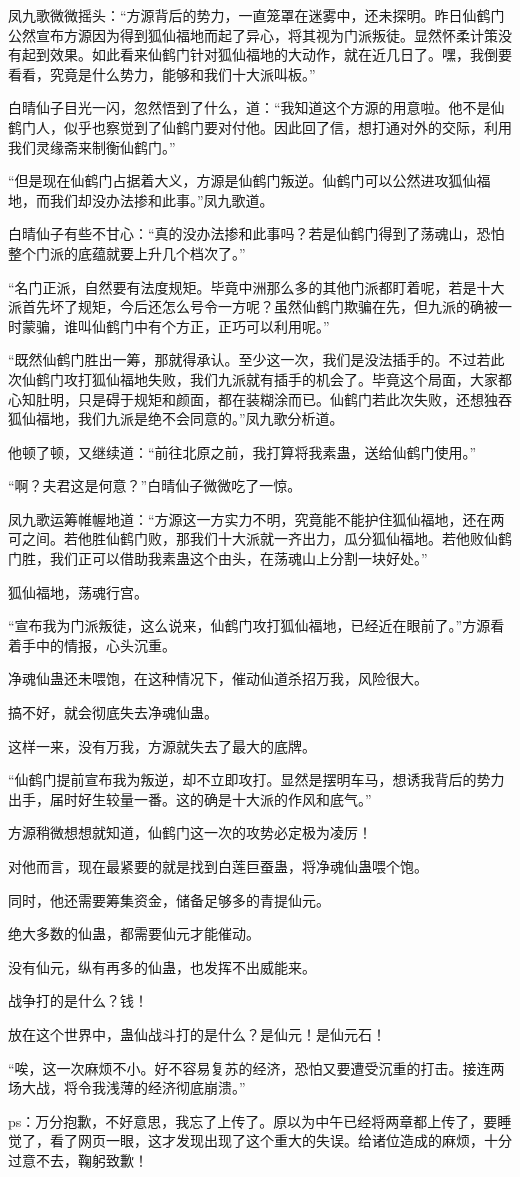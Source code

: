 \begin{this_body}
凤九歌微微摇头：“方源背后的势力，一直笼罩在迷雾中，还未探明。昨日仙鹤门公然宣布方源因为得到狐仙福地而起了异心，将其视为门派叛徒。显然怀柔计策没有起到效果。如此看来仙鹤门针对狐仙福地的大动作，就在近几日了。嘿，我倒要看看，究竟是什么势力，能够和我们十大派叫板。”

白晴仙子目光一闪，忽然悟到了什么，道：“我知道这个方源的用意啦。他不是仙鹤门人，似乎也察觉到了仙鹤门要对付他。因此回了信，想打通对外的交际，利用我们灵缘斋来制衡仙鹤门。”

“但是现在仙鹤门占据着大义，方源是仙鹤门叛逆。仙鹤门可以公然进攻狐仙福地，而我们却没办法掺和此事。”凤九歌道。

白晴仙子有些不甘心：“真的没办法掺和此事吗？若是仙鹤门得到了荡魂山，恐怕整个门派的底蕴就要上升几个档次了。”

“名门正派，自然要有法度规矩。毕竟中洲那么多的其他门派都盯着呢，若是十大派首先坏了规矩，今后还怎么号令一方呢？虽然仙鹤门欺骗在先，但九派的确被一时蒙骗，谁叫仙鹤门中有个方正，正巧可以利用呢。”

“既然仙鹤门胜出一筹，那就得承认。至少这一次，我们是没法插手的。不过若此次仙鹤门攻打狐仙福地失败，我们九派就有插手的机会了。毕竟这个局面，大家都心知肚明，只是碍于规矩和颜面，都在装糊涂而已。仙鹤门若此次失败，还想独吞狐仙福地，我们九派是绝不会同意的。”凤九歌分析道。

他顿了顿，又继续道：“前往北原之前，我打算将我素蛊，送给仙鹤门使用。”

“啊？夫君这是何意？”白晴仙子微微吃了一惊。

凤九歌运筹帷幄地道：“方源这一方实力不明，究竟能不能护住狐仙福地，还在两可之间。若他胜仙鹤门败，那我们十大派就一齐出力，瓜分狐仙福地。若他败仙鹤门胜，我们正可以借助我素蛊这个由头，在荡魂山上分割一块好处。”

狐仙福地，荡魂行宫。

“宣布我为门派叛徒，这么说来，仙鹤门攻打狐仙福地，已经近在眼前了。”方源看着手中的情报，心头沉重。

净魂仙蛊还未喂饱，在这种情况下，催动仙道杀招万我，风险很大。

搞不好，就会彻底失去净魂仙蛊。

这样一来，没有万我，方源就失去了最大的底牌。

“仙鹤门提前宣布我为叛逆，却不立即攻打。显然是摆明车马，想诱我背后的势力出手，届时好生较量一番。这的确是十大派的作风和底气。”

方源稍微想想就知道，仙鹤门这一次的攻势必定极为凌厉！

对他而言，现在最紧要的就是找到白莲巨蚕蛊，将净魂仙蛊喂个饱。

同时，他还需要筹集资金，储备足够多的青提仙元。

绝大多数的仙蛊，都需要仙元才能催动。

没有仙元，纵有再多的仙蛊，也发挥不出威能来。

战争打的是什么？钱！

放在这个世界中，蛊仙战斗打的是什么？是仙元！是仙元石！

“唉，这一次麻烦不小。好不容易复苏的经济，恐怕又要遭受沉重的打击。接连两场大战，将令我浅薄的经济彻底崩溃。”

ps：万分抱歉，不好意思，我忘了上传了。原以为中午已经将两章都上传了，要睡觉了，看了网页一眼，这才发现出现了这个重大的失误。给诸位造成的麻烦，十分过意不去，鞠躬致歉！

\end{this_body}

